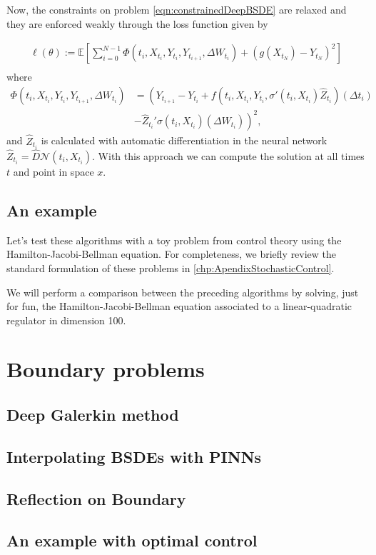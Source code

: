 Now, the constraints on problem \eqref{eqn:constrainedDeepBSDE} are relaxed and they are enforced weakly through the loss function given by

\begin{equation}
	\begin{gathered}
		\ell(\theta):=\mathbb{E}\left[\sum_{i=0}^{N-1} \Phi\left(t_i, X_{t_i}, Y_{t_i}, Y_{t_{i+1}}, \Delta W_{t_{i}}\right)+\left(g\left(X_{t_N}\right)-Y_{t_N}\right)^2\right] \\
	\end{gathered}
\end{equation}
where 
\begin{equation}
	\begin{split}
		\Phi\left(t_i, X_{t_i}, Y_{t_i}, Y_{t_{i+1}}, \Delta W_{t_i}\right)&=\left(Y_{t_{i+1}}-Y_{t_i}+f\left(t_i, X_{t_i}, Y_{t_i}, \sigma'\left(t_i, X_{t_i}\right) \widehat{Z}_{t_i}\right)\left(\Delta t_i\right)\right. \\
		&\left.-\widehat{Z}_{t_i}' \sigma\left(t_i, X_{t_i}\right)\left(\Delta W_{t_i}\right)\right)^2,
	\end{split}
\end{equation}
and $\widehat{Z}_{t_i}$ is calculated with automatic differentiation in the neural network $\widehat{Z}_{t_i}=\hat{D}\mathcal{N}(t_i,X_{t_i})$. With this approach we can compute the solution at all times $t$ and point in space $x$.
\subsection{An example}
Let's test these algorithms with a toy problem from control theory using the Hamilton-Jacobi-Bellman equation. For completeness, we briefly review the standard formulation of these problems in \autoref{chp:ApendixStochasticControl}.

We will perform a comparison between the preceding algorithms by solving, just for fun, the Hamilton-Jacobi-Bellman equation associated to a linear-quadratic regulator in dimension 100.

\section{Boundary problems}
\subsection{Deep Galerkin method}
\subsection{Interpolating BSDEs with PINNs}
\subsection{Reflection on Boundary}

\subsection{An example with optimal control}